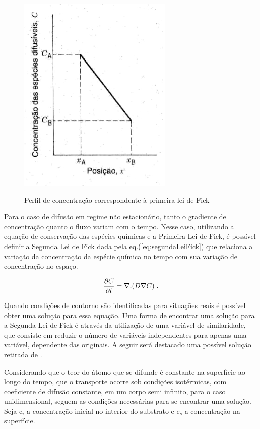 \documentclass[]{politex}
\begin{document}
	\begin{figure}[ht]
	\caption{Perfil de concentração correspondente à primeira lei de Fick}
	\includegraphics{primeiraLei}
	\label{fig:primeiraLei}
	\centering
	\end{figure}

	Para o caso de difusão em regime não estacionário, tanto o gradiente de concentração quanto o fluxo variam com o tempo. Nesse caso, utilizando a equação de conservação das espécies químicas e a Primeira Lei de Fick, é possível definir a Segunda Lei de Fick dada pela eq.(\ref{eq:segundaLeiFick}) que relaciona a variação da concentração da espécie química no tempo com sua variação de concentração no espaço. \par

\begin{equation} \label{eq:segundaLeiFick}
 \pdv{C}{t} = \nabla.(D\nabla C) \; .
\end{equation}

	Quando condições de contorno são identificadas para situações reais é possível obter uma solução para essa equação. Uma forma de encontrar uma solução para a Segunda Lei de Fick é através da utilização de uma variável de similaridade, que consiste em reduzir o número de variáveis independentes para apenas uma variável, dependente das originais. A seguir será destacado uma possível solução retirada de \cite{notas-modelos}. 
	
	Considerando que o teor do átomo que se difunde é constante na superfície ao longo do tempo, que o transporte ocorre sob condições isotérmicas, com coeficiente de difusão constante, em um corpo semi infinito, para o caso unidimensional, seguem as condições necessárias para se encontrar uma solução. Seja c$_i$ a concentração inicial no interior do substrato e c$_s$ a concentração na superfície.\par
\end{document}
